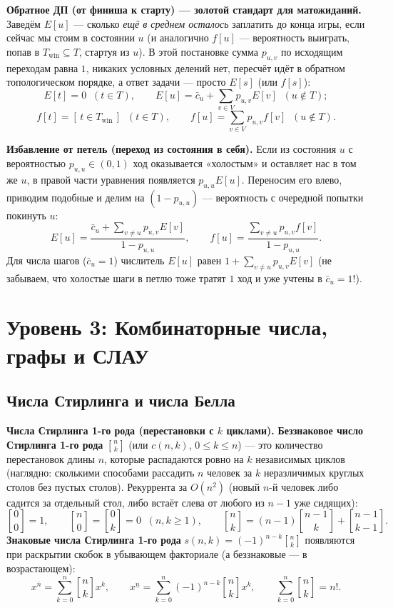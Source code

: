 \documentclass[10pt,a4paper]{article}
\renewcommand{\le}{\leqslant}
\renewcommand{\ge}{\geqslant}
\newcommand{\iverson}[1]{[\,#1\,]}
\newcommand{\fall}[2]{#1^{\underline{#2}}}
\newcommand{\rise}[2]{#1^{\overline{#2}}}
\newcommand{\stirlingfirst}[2]{\genfrac{[}{]}{0pt}{}{#1}{#2}}
\begin{document}
\textbf{Обратное ДП (от финиша к старту) — золотой стандарт для матожиданий.} Заведём $E[u]$ — сколько \emph{ещё в среднем осталось} заплатить до конца игры, если сейчас мы стоим в состоянии $u$ (и аналогично $f[u]$ — вероятность выиграть, попав в $T_{\text{win}} \subseteq T$, стартуя из $u$). В этой постановке сумма $p_{u,v}$ по исходящим переходам равна $1$, никаких условных делений нет, пересчёт идёт в обратном топологическом порядке, а ответ задачи — просто $E[s]$ (или $f[s]$):
\[
  E[t] = 0 \;\; (t \in T), \qquad E[u] = \bar{c}_u + \sum_{v \in V} p_{u,v} E[v] \;\; (u \notin T);
\]
\[
  f[t] = \iverson{t \in T_{\text{win}}} \;\; (t \in T), \qquad f[u] = \sum_{v \in V} p_{u,v} f[v] \;\; (u \notin T).
\]

\textbf{Избавление от петель (переход из состояния в себя).} Если из состояния $u$ с вероятностью $p_{u,u} \in (0, 1)$ ход оказывается «холостым» и оставляет нас в том же $u$, в правой части уравнения появляется $p_{u,u} E[u]$. Переносим его влево, приводим подобные и делим на $(1 - p_{u,u})$ — вероятность с очередной попытки покинуть $u$:
\[
  E[u] = \frac{\bar{c}_u + \sum_{v \ne u} p_{u,v} E[v]}{1 - p_{u,u}}, \qquad
  f[u] = \frac{\sum_{v \ne u} p_{u,v} f[v]}{1 - p_{u,u}}.
\]
Для числа шагов ($\bar{c}_u = 1$) числитель $E[u]$ равен $1 + \sum_{v \ne u} p_{u,v} E[v]$ (не забываем, что холостые шаги в петлю тоже тратят $1$ ход и уже учтены в $\bar{c}_u = 1$!).

\section{Уровень 3: Комбинаторные числа, графы и СЛАУ}

\subsection{Числа Стирлинга и числа Белла}

\textbf{Числа Стирлинга 1-го рода (перестановки с $k$ циклами).} \textbf{Беззнаковое число Стирлинга 1-го рода} $\stirlingfirst{n}{k}$ (или $c(n, k)$, $0 \le k \le n$) — это количество перестановок длины $n$, которые распадаются ровно на $k$ независимых циклов (наглядно: сколькими способами рассадить $n$ человек за $k$ неразличимых круглых столов без пустых столов). Рекуррента за $O(n^2)$ (новый $n$-й человек либо садится за отдельный стол, либо встаёт слева от любого из $n - 1$ уже сидящих):
\[
  \stirlingfirst{0}{0} = 1, \qquad \stirlingfirst{n}{0} = \stirlingfirst{0}{k} = 0 \;\;(n, k \ge 1), \qquad
  \stirlingfirst{n}{k} = (n - 1)\stirlingfirst{n - 1}{k} + \stirlingfirst{n - 1}{k - 1}.
\]
\textbf{Знаковые числа Стирлинга 1-го рода} $s(n, k) = (-1)^{n - k}\stirlingfirst{n}{k}$ появляются при раскрытии скобок в убывающем факториале (а беззнаковые — в возрастающем):
\[
  \rise{x}{n} = \sum_{k=0}^{n} \stirlingfirst{n}{k} x^k, \qquad
  \fall{x}{n} = \sum_{k=0}^{n} (-1)^{n - k} \stirlingfirst{n}{k} x^k, \qquad
  \sum_{k=0}^{n} \stirlingfirst{n}{k} = n!.
\]
\end{document}
